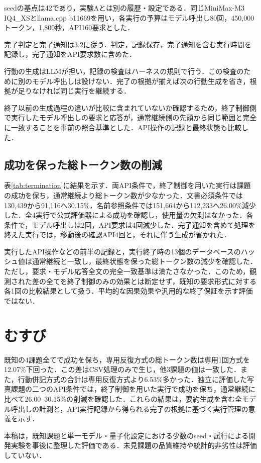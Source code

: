 \documentclass[letter]{ieicej}
\begin{document}
seedの基点は42であり，実験Aとは別の履歴・設定である．同じMiniMax-M3 IQ4\_XSとllama.cpp b11669を用い，各実行の予算はモデル呼出し80回，450,000トークン，1,800秒，API160要求とした．

完了判定と完了通知は3.2に従う．判定，記録保存，完了通知を含む実行時間を記録し，完了通知をAPI要求数に含めた．

行動の生成はLLMが担い，記録の検査はハーネスの規則で行う．この検査のために別のモデル呼出しは設けない．完了の根拠が揃えば次の行動生成を省き，根拠が足りなければ同じ実行を継続する．

終了以前の生成過程の違いが比較に含まれていないか確認するため，終了制御側で実行したモデル呼出しの要求と応答が，通常継続側の先頭から同じ範囲と完全に一致することを事前の照合基準とした．API操作の記録と最終状態も比較した．

\subsection{成功を保った総トークン数の削減}

表\ref{tab:termination}に結果を示す．両API条件で，終了制御を用いた実行は課題の成功を保ち，通常継続より総トークン数が少なかった．文書必須条件では130,439から91,116へ30.15\%，名前参照条件では151,664から112,233へ26.00\%減少した．全4実行で公式評価器による成功を確認し，使用量の欠測はなかった．各条件で，モデル呼出しは2回，API要求は4回減少した．完了通知を含めて処理を終えた実行では，移動後の確認API4回と，それに伴う生成が省かれた．

\TerminationResultsTable

\par\noindent\begin{minipage}{\columnwidth}
実行したAPI操作などの前半の記録と，実行終了時の13個のデータベースのハッシュ値は通常継続と一致し，最終状態を保った総トークン数の減少を確認した．ただし，要求・モデル応答全文の完全一致基準は満たさなかった．このため，観測された差の全てを終了制御のみの効果とは断定せず，既知の要求形式に対する各1回の比較結果として扱う．平均的な因果効果や汎用的な終了保証を示す評価ではない．
\end{minipage}\par{}

\section{むすび}

既知の4課題全てで成功を保ち，専用反復方式の総トークン数は専用1回方式を12.07\%下回った．この差はCSV処理のみで生じ，他3課題の値は一致した．また，行動併記方式の合計は専用反復方式より6.53\%多かった．独立に評価した写真課題の二つのAPI条件では，終了制御を用いた実行で成功を保ち，通常継続に比べて26.00--30.15\%の削減を確認した．これらの結果は，要約生成を含む全モデル呼出しの計測と，API実行記録から得られる完了の根拠に基づく実行管理の意義を示す．

本稿は，既知課題と単一モデル・量子化設定における少数のseed・試行による開発実験を事後に整理した評価である．未見課題の品質維持や統計的非劣性は評価していない．


\end{document}
